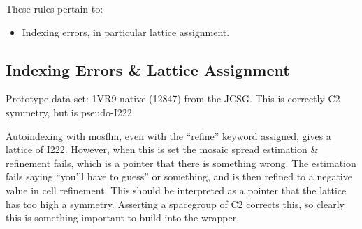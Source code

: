 \documentclass[a4paper, 11pt]{article}
\begin{document}
These rules pertain to:

\begin{itemize}
\item{Indexing errors, in particular lattice assignment.}
\end{itemize}

\subsection{Indexing Errors \& Lattice Assignment}

Prototype data set: 1VR9 native (12847) from the JCSG. This is correctly
C2 symmetry, but is pseudo-I222. 

Autoindexing with mosflm, even with the ``refine'' keyword assigned, gives
a lattice of I222. However, when this is set the mosaic spread 
estimation \& refinement fails, which is a pointer that there is 
something wrong. The estimation fails saying ``you'll have to guess'' or
something, and is then refined to a negative value in cell refinement. This
should be interpreted as a pointer that the lattice has too high a symmetry.
Asserting a spacegroup of C2 corrects this, so clearly this is something
important to build into the wrapper.
\end{document}

